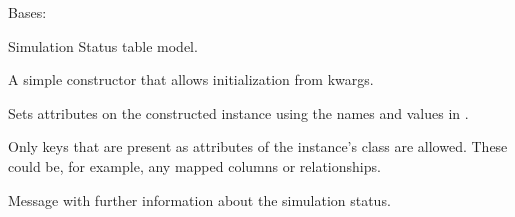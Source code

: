 \documentclass[a4paper,landscape,10pt,english]{sphinxmanual}
\begin{document}
\begin{fulllineitems}
\label{\detokenize{code_docs/simulation_api.model:simulation_api.model.models.SimulationDB}}
Bases: 

Simulation Status table model.

\begin{fulllineitems}
\label{\detokenize{code_docs/simulation_api.model:simulation_api.model.models.SimulationDB.__init__}}
A simple constructor that allows initialization from kwargs.

Sets attributes on the constructed instance using the names and
values in .

Only keys that are present as
attributes of the instance’s class are allowed. These could be,
for example, any mapped columns or relationships.

\end{fulllineitems}


\begin{fulllineitems}
\label{\detokenize{code_docs/simulation_api.model:simulation_api.model.models.SimulationDB.date}}
\end{fulllineitems}


\begin{fulllineitems}
\label{\detokenize{code_docs/simulation_api.model:simulation_api.model.models.SimulationDB.message}}
Message with further information about the simulation status.

\end{fulllineitems}


\end{fulllineitems}
\end{document}
